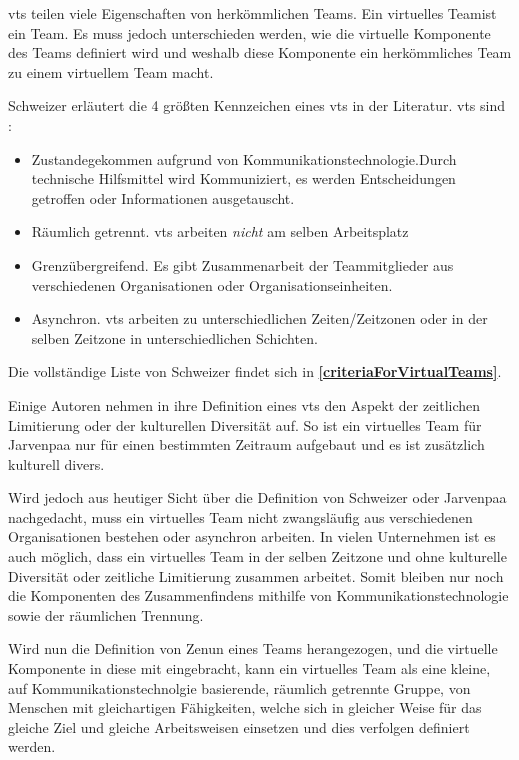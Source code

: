 \documentclass[a4paper,11pt]{article}%
\renewcommand{\\}{\vspace*{0.5\baselineskip} \newline}
\begin{document}
\ac{vts} teilen viele Eigenschaften von herkömmlichen Teams. Ein \dq virtuelles Team\dq ist ein \dq Team\dq. Es muss jedoch unterschieden werden, wie die virtuelle Komponente des Teams definiert wird und weshalb diese Komponente ein herkömmliches Team zu einem virtuellem Team macht. 

Schweizer \citep[p.270]{schweitzer2010conceptualizing} erläutert die 4 größten Kennzeichen eines \ac{vts} in der Literatur.
\ac{vts} sind :
\begin{itemize}
\item Zustandegekommen aufgrund von Kommunikationstechnologie.Durch technische Hilfsmittel wird Kommuniziert, es werden Entscheidungen getroffen oder Informationen ausgetauscht.
\item Räumlich getrennt. \ac{vts} arbeiten \textit{nicht} am selben Arbeitsplatz
\item Grenzübergreifend. Es gibt Zusammenarbeit der Teammitglieder aus verschiedenen Organisationen oder Organisationseinheiten.
\item Asynchron. \ac{vts} arbeiten zu unterschiedlichen Zeiten/Zeitzonen oder in der selben Zeitzone in unterschiedlichen Schichten.
\end{itemize}

Die vollständige Liste von Schweizer findet sich in \textbf{\autoref{criteriaForVirtualTeams}}.

Einige Autoren nehmen in ihre Definition eines \ac{vts} den Aspekt der zeitlichen Limitierung oder der kulturellen Diversität auf. So ist ein virtuelles Team für Jarvenpaa \citep[p.1-2]{jarvenpaa1999communication} nur für einen bestimmten Zeitraum aufgebaut und es ist zusätzlich kulturell divers. 

Wird jedoch aus heutiger Sicht über die Definition von Schweizer oder Jarvenpaa nachgedacht, muss ein virtuelles Team nicht zwangsläufig aus verschiedenen Organisationen bestehen oder asynchron arbeiten. In vielen Unternehmen ist es auch möglich, dass ein virtuelles Team in der selben Zeitzone und ohne kulturelle Diversität oder zeitliche Limitierung zusammen arbeitet.
Somit bleiben nur noch die Komponenten des Zusammenfindens mithilfe von Kommunikationstechnologie sowie der räumlichen Trennung.

Wird nun die Definition von Zenun \citep[p.2]{zenun2007effects} eines Teams herangezogen, und die virtuelle Komponente in diese mit eingebracht, kann ein virtuelles Team als \\
\dq{}eine kleine, auf Kommunikationstechnolgie basierende, räumlich getrennte Gruppe, von Menschen mit gleichartigen Fähigkeiten, welche sich in gleicher Weise für das gleiche Ziel und gleiche Arbeitsweisen einsetzen und dies verfolgen\dq{} \\
definiert werden.
\end{document}
